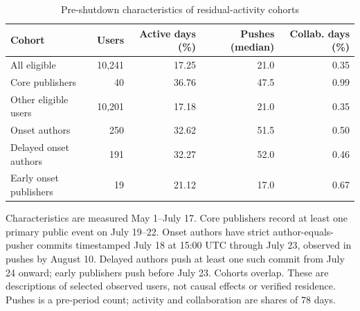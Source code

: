 \begin{table}[htbp]
\centering
\small
\caption{Pre-shutdown characteristics of residual-activity cohorts}
\label{tab:advisor_residual}
\begin{threeparttable}
\begin{tabular}{@{}p{}rrrr@{}}
\toprule
Cohort & Users & Active days (\%) & Pushes (median) & Collab. days (\%) \\
\midrule
All eligible & 10,241 & 17.25 & 21.0 & 0.35 \\
Core publishers & 40 & 36.76 & 47.5 & 0.99 \\
Other eligible users & 10,201 & 17.18 & 21.0 & 0.35 \\
Onset authors & 250 & 32.62 & 51.5 & 0.50 \\
Delayed onset authors & 191 & 32.27 & 52.0 & 0.46 \\
Early onset publishers & 19 & 21.12 & 17.0 & 0.67 \\
\bottomrule
\end{tabular}
\begin{tablenotes}[flushleft]
\footnotesize
\item Characteristics are measured May 1--July 17. Core publishers record at least one primary public event on July 19--22. Onset authors have strict author-equals-pusher commits timestamped July 18 at 15:00 UTC through July 23, observed in pushes by August 10. Delayed authors push at least one such commit from July 24 onward; early publishers push before July 23. Cohorts overlap. These are descriptions of selected observed users, not causal effects or verified residence. Pushes is a pre-period count; activity and collaboration are shares of 78 days.
\end{tablenotes}
\end{threeparttable}
\end{table}
